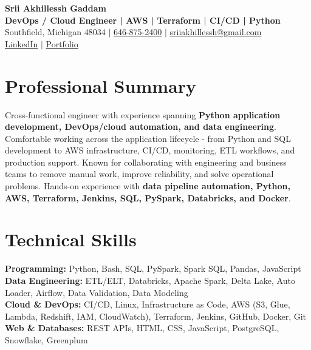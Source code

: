 \documentclass[letterpaper,10pt]{article}
\begin{document}
\fontsize{9.35pt}{10.45pt}\selectfont

\begin{center}
    {\LARGE \textbf{Srii Akhillessh Gaddam}} \\[-1pt]
    \textbf{DevOps / Cloud Engineer | AWS | Terraform | CI/CD | Python} \\[2pt]
    Southfield, Michigan 48034 $|$
    \href{tel:6468752400}{646-875-2400} $|$
    \href{mailto:sriiakhillessh@gmail.com}{sriiakhillessh@gmail.com} \\[1pt]
    \href{https://www.linkedin.com/in/srii-akhiilessh-gaddam-b48668191/}{LinkedIn} $|$
    \href{https://sriiakhillesshg.github.io/portfolio/}{Portfolio}
\end{center}
\vspace{-8pt}

\section{Professional Summary}
\small{Cross-functional engineer with experience spanning \textbf{Python application development, DevOps/cloud automation, and data engineering}. Comfortable working across the application lifecycle - from Python and SQL development to AWS infrastructure, CI/CD, monitoring, ETL workflows, and production support. Known for collaborating with engineering and business teams to remove manual work, improve reliability, and solve operational problems. Hands-on experience with \textbf{data pipeline automation, Python, AWS, Terraform, Jenkins, SQL, PySpark, Databricks, and Docker}.}

\section{Technical Skills}
\small{
\textbf{Programming:} Python, Bash, SQL, PySpark, Spark SQL, Pandas, JavaScript \\
\textbf{Data Engineering:} ETL/ELT, Databricks, Apache Spark, Delta Lake, Auto Loader, Airflow, Data Validation, Data Modeling \\
\textbf{Cloud \& DevOps:} CI/CD, Linux, Infrastructure as Code, AWS (S3, Glue, Lambda, Redshift, IAM, CloudWatch), Terraform, Jenkins, GitHub, Docker, Git \\
\textbf{Web \& Databases:} REST APIs, HTML, CSS, JavaScript, PostgreSQL, Snowflake, Greenplum
}
\end{document}
